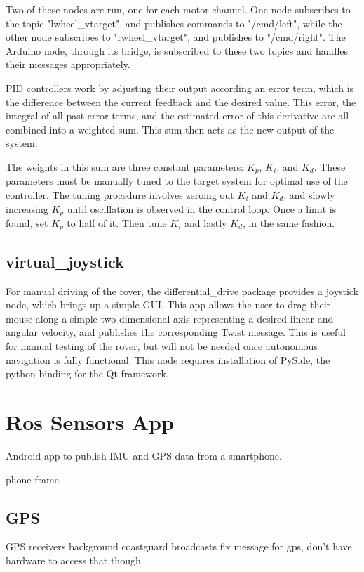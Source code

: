 Two of these nodes are run, one for each motor channel. One node subscribes to the topic "lwheel\_vtarget", and publishes commands to "/cmd/left", while the other node subscribes to "rwheel\_vtarget", and publishes to "/cmd/right". The Arduino node, through its bridge, is subscribed to these two topics and handles their messages appropriately.

PID controllers work by adjusting their output according an error term, which is the difference between the current feedback and the desired value. This error, the integral of all past error terms, and the estimated error of this derivative are all combined into a weighted sum. This sum then acts as the new output of the system.

The weights in this sum are three constant parameters: \(K_p\), \(K_i\), and \(K_d\). These parameters must be manually tuned to the target system for optimal use of the controller. The tuning procedure involves zeroing out \(K_i\) and \(K_d\), and slowly increasing \(K_p\) until oscillation is observed in the control loop. Once a limit is found, set \(K_p\) to half of it. Then tune \(K_i\) and lastly \(K_d\), in the same fashion. 

\subsection{virtual\_joystick} \label{sectionJoystick}
For manual driving of the rover, the differential\_drive package provides a joystick node, which brings up a simple GUI. This app allows the user to drag their mouse along a simple two-dimensional axis representing a desired linear and angular velocity, and publishes the corresponding Twist message. This is useful for manual testing of the rover, but will not be needed once autonomous navigation is fully functional. This node requires installation of PySide, the python binding for the Qt framework.

\section{Ros Sensors App}
Android app to publish IMU and GPS data from a smartphone.

phone frame

\subsection{GPS}
GPS receivers background
coastguard broadcasts fix message for gps, don't have hardware to access that though

